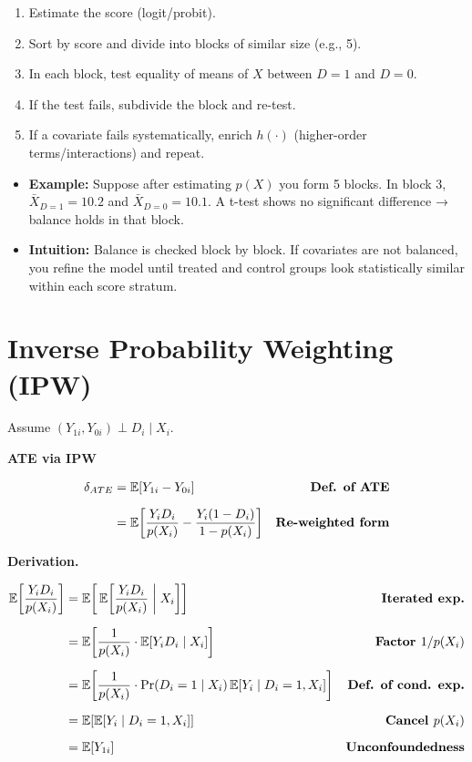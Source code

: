\documentclass[12pt]{article}
\begin{document}
\begin{enumerate}
    \item Estimate the score (logit/probit).
    \item Sort by score and divide into blocks of similar size (e.g., 5).
    \item In each block, test equality of means of $X$ between $D=1$ and $D=0$.
    \item If the test fails, subdivide the block and re-test.
    \item If a covariate fails systematically, enrich $h(\cdot)$ (higher-order terms/interactions) and repeat.
\end{enumerate}


\begin{itemize}
    \item \textbf{Example:} Suppose after estimating $p(X)$ you form 5 blocks. In block 3, $\bar{X}_{D=1}=10.2$ and $\bar{X}_{D=0}=10.1$. A t-test shows no significant difference → balance holds in that block.
    \item \textbf{Intuition:} Balance is checked block by block. If covariates are not balanced, you refine the model until treated and control groups look statistically similar within each score stratum.
\end{itemize}

\section*{\noindent\textbf{Inverse Probability Weighting (IPW)}}

Assume $(Y_{1i},Y_{0i}) \perp D_i \mid X_i$.

\textbf{ATE via IPW}

\singlespacing
\begin{align}
\delta_{ATE} 
   &= \mathbb{E}[Y_{1i} - Y_{0i}] 
   & \text{\textbf{Def. of ATE}} \\[6pt]
   &= \mathbb{E}\!\left[\frac{Y_i D_i}{p(X_i)} - \frac{Y_i (1-D_i)}{1-p(X_i)}\right] 
   & \text{\textbf{Re-weighted form}}
\end{align}

\textbf{Derivation.}

\singlespacing
\begin{align}
\mathbb{E}\!\left[\frac{Y_i D_i}{p(X_i)}\right] 
   &= \mathbb{E}\!\left[\,\mathbb{E}\!\left[\frac{Y_i D_i}{p(X_i)} \;\middle|\; X_i\right]\right] 
   & \text{\textbf{Iterated exp.}} \\[6pt]
   &= \mathbb{E}\!\left[\frac{1}{p(X_i)} \cdot \mathbb{E}[Y_i D_i \mid X_i]\right] 
   & \text{\textbf{Factor $1/p(X_i)$}} \\[6pt]
   &= \mathbb{E}\!\left[\frac{1}{p(X_i)} \cdot \Pr(D_i=1 \mid X_i)\, \mathbb{E}[Y_i \mid D_i=1,X_i]\right] 
   & \text{\textbf{Def. of cond. exp.}} \\[6pt]
   &= \mathbb{E}\!\left[\mathbb{E}[Y_i \mid D_i=1,X_i]\right] 
   & \text{\textbf{Cancel $p(X_i)$}} \\[6pt]
   &= \mathbb{E}[Y_{1i}] 
   & \text{\textbf{Unconfoundedness}}
\end{align}
\end{document}
